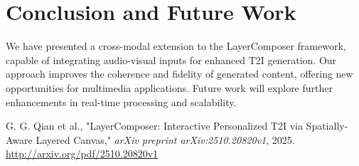 \documentclass{article}
\begin{document}
\section{Conclusion and Future Work}
We have presented a cross-modal extension to the LayerComposer framework, capable of integrating audio-visual inputs for enhanced T2I generation. Our approach improves the coherence and fidelity of generated content, offering new opportunities for multimedia applications. Future work will explore further enhancements in real-time processing and scalability.


\begin{thebibliography}{9}
G. G. Qian et al., "LayerComposer: Interactive Personalized T2I via Spatially-Aware Layered Canvas," \textit{arXiv preprint arXiv:2510.20820v1}, 2025. \url{http://arxiv.org/pdf/2510.20820v1}
\end{thebibliography}
\end{document}
